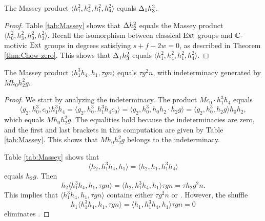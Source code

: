 \begin{lemma}
\label{lem:h1^2,h4^2,h1^2,h4^2}
The Massey product $\langle h_1^2, h_4^2, h_1^2, h_4^2 \rangle$
equals $\Delta_1 h_3^2$.
\end{lemma}

\begin{proof}
Table \ref{tab:Massey} shows that $\Delta h_2^2$ equals the Massey product
$\langle h_0^2, h_3^2, h_0^2, h_3^2 \rangle$.
Recall the isomorphism between classical $\operatorname{Ext}$ groups
and $\mathbb{C}$-motivic $\operatorname{Ext}$ groups in degrees satisfying $s+f-2w=0$,
as described in Theorem \ref{thm:Chow-zero}.
This shows that 
$\Delta_1 h_3^2$ equals $\langle h_1^2, h_4^2, h_1^2, h_4^2 \rangle$.
\end{proof}


\begin{lemma}
\label{lem:h1^3h4,h1,tgn}
The Massey product $\langle h_1^3 h_4, h_1, \tau g n \rangle$
equals $\tau g^2 n$, with indeterminacy generated by
$M h_0 h_2^2 g$.
\end{lemma}

\begin{proof}
We start by analyzing the indeterminacy.
The product $M c_0 \cdot h_1^3 h_4$ equals
\[
\langle g_2, h_0^3, c_0 \rangle h_1^3 h_4 = 
\langle g_2, h_0^3, h_1^3 h_4 c_0 \rangle =
\langle g_2, h_0^3, h_0 h_2 \cdot h_2 g \rangle =
\langle g_2, h_0^3, h_2 g \rangle h_0 h_2,
\]
which equals $M h_0 h_2^2 g$.
The equalities hold because the indeterminacies are zero, and
the first and last brackets in this computation are given by
Table \ref{tab:Massey}.
This shows that $M h_0 h_2^2 g$ belongs to the indeterminacy.

Table \ref{tab:Massey} shows that
\[
\langle h_2, h_1^3 h_4, h_1 \rangle = 
\langle h_2, h_1, h_1^3 h_4 \rangle
\]
equals $h_2 g$.
Then 
\[
h_2 \langle h_1^3 h_4, h_1, \tau g n \rangle =
\langle h_2, h_1^3 h_4, h_1 \rangle \tau g n = \tau h_2 g^2 n.
\]
This implies that
$\langle h_1^3 h_4, h_1, \tau g n \rangle$
contains either $\tau g^2 n$ or .
However, the shuffle
\[
h_1 \langle h_1^3 h_4, h_1, \tau g n \rangle =
\langle h_1, h_1^3 h_4, h_1 \rangle \tau g n = 0
\]
eliminates .
\end{proof}


